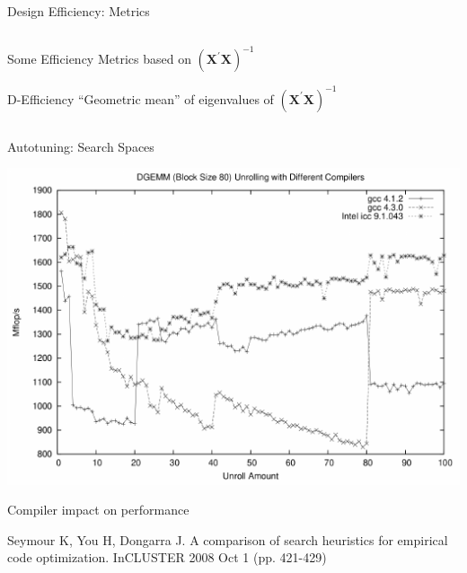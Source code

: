 \documentclass[10pt, compress, aspectratio=169, xcolor={table,usenames,dvipsnames}]{beamer}
\begin{document}
\begin{frame}[label={sec:orga934280}]{Design Efficiency: Metrics}
\begin{columns}
\begin{column}{0.5\columnwidth}
\begin{block}{Some Efficiency Metrics based on \(\left(\bm{X}^{\prime}\bm{X}\right)^{-1}\)}
\begin{block}{D-Efficiency}
\vspace{-.3cm}
\colorbox{Accent!25}{``Geometric mean'' of eigenvalues of \(\left(\bm{X}^{\prime}\bm{X}\right)^{-1}\)}
\end{block}
\end{block}
\end{column}
\end{columns}
\end{frame}
\begin{frame}[label={sec:orga0a8507}]{Autotuning: Search Spaces}
\addtocounter{framenumber}{-1}
\begin{center}
\begin{center}
\includegraphics[width=.6\linewidth]{../../img/seymour2008comparison_compilers.pdf}
\end{center}

\vspace{-.2cm}

\alert{Compiler impact} on performance

\scriptsize{Seymour K, You H, Dongarra J. A comparison of search heuristics for empirical code optimization. InCLUSTER 2008 Oct 1 (pp. 421-429)}
\end{center}
\end{frame}
\end{document}
